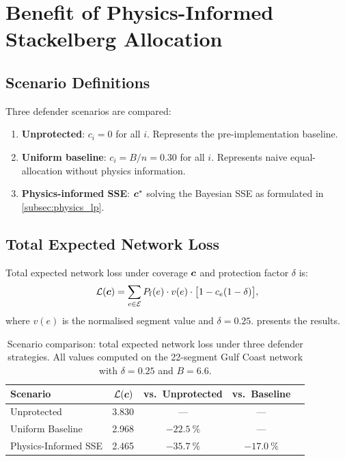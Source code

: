 \section{Benefit of Physics-Informed Stackelberg Allocation}
\label{sec:results_stackelberg}

\subsection{Scenario Definitions}
\label{subsec:results_scenarios}

Three defender scenarios are compared:

\begin{enumerate}
  \item \textbf{Unprotected}: $c_i = 0$ for all $i$. Represents the
    pre-implementation baseline.
  \item \textbf{Uniform baseline}: $c_i = B/n = \num{0.30}$ for all $i$.
    Represents naive equal-allocation without physics information.
  \item \textbf{Physics-informed SSE}: $\bm{c}^*$ solving the Bayesian
    SSE as formulated in \cref{subsec:physics_lp}.
\end{enumerate}

\subsection{Total Expected Network Loss}
\label{subsec:results_loss}

Total expected network loss under coverage $\bm{c}$ and protection
factor $\delta$ is:
\begin{equation}
  \mathcal{L}(\bm{c}) = \sum_{e \in \mathcal{E}}
    P_{\mathrm{f}}(e) \cdot v(e) \cdot \bigl[1 - c_e(1 - \delta)\bigr],
  \label{eq:network_loss}
\end{equation}
where $v(e)$ is the normalised segment value and $\delta = \num{0.25}$.
 presents the results.

\begin{table}[htbp]
  \centering
  \caption{Scenario comparison: total expected network loss under three
    defender strategies.  All values computed on the 22-segment Gulf
    Coast network with $\delta = \num{0.25}$ and $B = \num{6.6}$.}
  \label{tab:scenario_comparison}
  \begin{tabular}{@{}lcccc@{}}
    \toprule
    Scenario & $\mathcal{L}(\bm{c})$ & vs.\ Unprotected & vs.\ Baseline \\
    \midrule
    Unprotected          & 3.830 & ---             & --- \\
    Uniform Baseline     & 2.968 & $-\SI{22.5}{\percent}$ & --- \\
    Physics-Informed SSE & 2.465 & $-\SI{35.7}{\percent}$
      & $-\SI{17.0}{\percent}$ \\
    \bottomrule
  \end{tabular}
\end{table}

